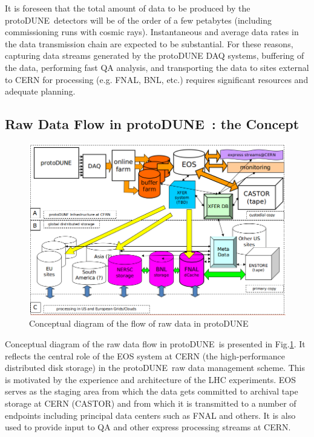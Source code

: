 \documentclass[pdftex,12pt,letter]{article}
\newcommand{\pd}{protoDUNE\ }
\begin{document}
It is foreseen that the total amount of data to be produced by the \pd detectors will be of the order of a few
petabytes (including commissioning runs with cosmic rays). Instantaneous and average data rates in the data transmission chain are expected to be
substantial. For these reasons, capturing data streams generated by the protoDUNE DAQ systems, buffering of the data, performing fast QA analysis,
and transporting the data to sites external to CERN for processing (e.g. FNAL, BNL, etc.) requires significant resources and adequate planning.

\subsection{Raw Data Flow in \pd: the Concept}
\begin{figure}[tbh]
\centering\includegraphics[width=\linewidth]{protoDUNE_raw_data_concept.png}
\caption{\label{fig:raw_concept}Conceptual diagram of the flow of raw data in \pd}
\end{figure}

\noindent
Conceptual diagram of the raw data flow in \pd is presented in Fig.\ref{fig:raw_concept}. It reflects the central role of the EOS
system at CERN (the high-performance distributed disk storage) in the \pd raw data management scheme. This is motivated by the experience
and architecture of the LHC experiments. EOS serves as the staging area from which the data gets committed to archival tape storage at
CERN (CASTOR) and from which it is transmitted to a number of endpoints including principal data centers such as FNAL and others.
It is also used to provide input to QA and other express processing streams at CERN.
\end{document}
